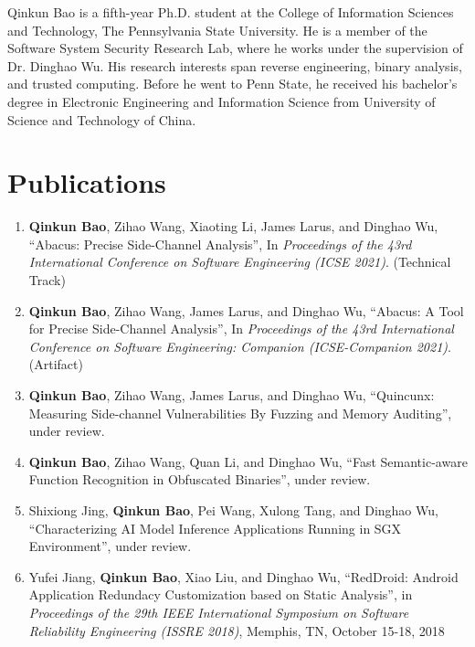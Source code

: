 
Qinkun Bao is a fifth-year Ph.D. student at the College of Information Sciences
and Technology, The Pennsylvania State University. He is a member of the Software 
System Security Research Lab, where he works under the supervision of Dr. Dinghao Wu.
His research interests span reverse engineering, binary analysis, and trusted computing. Before he went to Penn State, he received his bachelor's degree in Electronic Engineering and Information Science from University of Science and Technology of China.


  \section*{Publications}
  \begin{enumerate}
    \item \textbf{Qinkun Bao}, Zihao Wang, Xiaoting Li, James Larus, and Dinghao Wu, ``Abacus: Precise Side-Channel Analysis'', In \emph{Proceedings of the 43rd International Conference on Software Engineering (ICSE 2021)}. (Technical Track)
    \item \textbf{Qinkun Bao}, Zihao Wang, James Larus, and Dinghao Wu, ``Abacus: A Tool for Precise Side-Channel Analysis'', In \emph{Proceedings of the 43rd International Conference on Software Engineering: Companion (ICSE-Companion 2021)}. (Artifact)
    
    \item \textbf{Qinkun Bao}, Zihao Wang, James Larus, and Dinghao Wu, ``Quincunx: Measuring Side-channel Vulnerabilities
    By Fuzzing and Memory Auditing'', under review.

    \item \textbf{Qinkun Bao}, Zihao Wang, Quan Li, and Dinghao Wu, ``Fast Semantic-aware Function Recognition in Obfuscated Binaries'', under review.
    
    \item Shixiong Jing, \textbf{Qinkun Bao}, Pei Wang, Xulong Tang, and Dinghao Wu, ``Characterizing AI Model Inference Applications Running in SGX Environment'', under review.
    
    \item Yufei Jiang, \textbf{Qinkun Bao}, Xiao Liu, and Dinghao Wu, ``RedDroid: Android Application Redundacy Customization based on Static Analysis'', in \emph{Proceedings of the 29th IEEE International Symposium on Software Reliability Engineering (ISSRE 2018)}, Memphis, TN, October 15-18, 2018
 

\end{enumerate}
